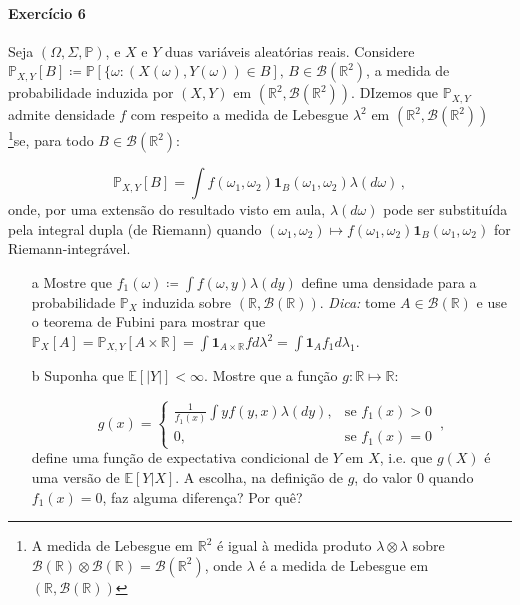 \documentclass[10pt,a4paper]{article}
\begin{document}
		\paragraph{Exercício 6} Seja $(\Omega, \Sigma, \mathbb{P})$, e $X$ e $Y$ duas variáveis aleatórias reais. Considere $\mathbb{P}_{X,Y}[B] \coloneqq \mathbb{P}[\{\omega: (X(\omega),Y(\omega)) \in B], \, B\in \mathcal{B}(\mathbb{R}^2)$, a medida de probabilidade induzida por $(X,Y)$ em $(\mathbb{R}^2, \mathcal{B}(\mathbb{R}^2))$. DIzemos que $\mathbb{P}_{X,Y}$ admite densidade $f$ com respeito a medida de Lebesgue $\lambda^2$ em $(\mathbb{R}^2, \mathcal{B}(\mathbb{R}^2))$ \footnote{A medida de Lebesgue em $\mathbb{R}^2$ é igual à medida produto $\lambda \otimes \lambda$ sobre $\mathcal{B}(\mathbb{R})\otimes \mathcal{B}(\mathbb{R}) = \mathcal{B}(\mathbb{R}^2)$, onde $\lambda$ é a medida de Lebesgue em $(\mathbb{R},\mathcal{B}(\mathbb{R}))$}se, para todo $B\in \mathcal{B}(\mathbb{R}^2)$:
		
		$$\mathbb{P}_{X,Y}[B] = \int f(\omega_1,\omega_2) \mathbf{1}_B(\omega_1,\omega_2)\lambda(d \omega )\, ,$$
		onde, por uma extensão do resultado visto em aula, $\lambda(d \omega )$ pode ser substituída pela integral dupla (de Riemann) quando $(\omega_1,\omega_2) \mapsto f(\omega_1,\omega_2) \mathbf{1}_B(\omega_1,\omega_2)$ for Riemann-integrável.
		
	\begin{itemize}
		\item[a] Mostre que $f_1(\omega) \coloneqq \int f(\omega, y)\lambda(dy)$ define uma densidade para a probabilidade $\mathbb{P}_X$ induzida sobre $(\mathbb{R}, \mathcal{B}(\mathbb{R}))$. \textit{Dica:} tome $A \in \mathcal{B}(\mathbb{R})$ e use o teorema de Fubini para mostrar que  $ \mathbb{P}_{X}[A] = \mathbb{P}_{X,Y}[A\times \mathbb{R}] =  \int \mathbf{1}_{A \times \mathbb{R}} f d\lambda^2 = \int \mathbf{1}_{A} f_1 d\lambda_1$. 
		\item[b] Suponha que $\mathbb{E}[|Y|]<\infty$. Mostre que a função $g:\mathbb{R} \mapsto \mathbb{R}$:
		
		$$g(x) =\begin{cases}
			\frac{1}{f_1(x)} \int y f(y,x) \lambda(d y ), & \text{se } f_1(x) > 0 \\
			0, & \text{se } f_1(x) = 0
		\end{cases}\, ,$$
		define uma função de expectativa condicional de $Y$ em $X$, i.e. que $g(X)$ é uma versão de $\mathbb{E}[Y|X]$. A escolha, na definição de $g$, do valor $0$ quando $f_1(x) = 0$, faz alguma diferença? Por quê?
		
	\end{itemize}
\end{document}
